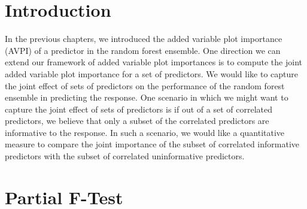 \documentclass[12pt,twoside]{reedthesis}
\theoremstyle{definition}
\theoremstyle{definition}
\theoremstyle{definition}
\theoremstyle{remark}
\begin{document}
\section{Introduction}\label{introduction-4}

In the previous chapters, we introduced the added variable plot
importance (AVPI) of a predictor in the random forest ensemble. One
direction we can extend our framework of added variable plot importances
is to compute the joint added variable plot importance for a set of
predictors. We would like to capture the joint effect of sets of
predictors on the performance of the random forest ensemble in
predicting the response. One scenario in which we might want to capture
the joint effect of sets of predictors is if out of a set of correlated
predictors, we believe that only a subset of the correlated predictors
are informative to the response. In such a scenario, we would like a
quantitative measure to compare the joint importance of the subset of
correlated informative predictors with the subset of correlated
uninformative predictors. \par

\section{Partial F-Test}\label{partial-f-test}
\end{document}
